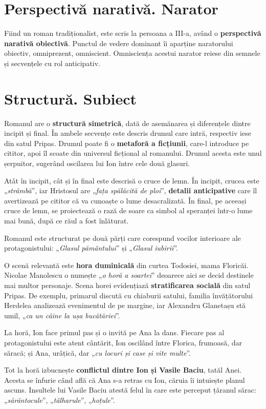 \documentclass{article}
\newcommand{\qu}[1]{„\emph{#1}”}
\begin{document}
\section{Perspectivă narativă. Narator}
Fiind un roman tradiționalist, este scris la persoana a III-a, având o \textbf{perspectivă narativă obiectivă}. Punctul de vedere dominant îi aparține naratorului obiectiv, omniprezent, omniscient. Omnisciența acestui narator reiese din semnele și secvențele cu rol anticipativ.
\section{Structură. Subiect}
Romanul are o \textbf{structură simetrică}, dată de asemănarea și diferențele dintre incipit și final. În ambele secvențe este descris drumul care intră, respectiv iese din satul Pripas. Drumul poate fi o \textbf{metaforă a ficțiunii}, care-l introduce pe cititor, apoi îl scoate din universul ficțional al romanului. Drumul acesta este unul șerpuitor, sugerând oscilarea lui Ion între cele două glasuri.

Atât în incipit, cât și în final este descrisă o cruce de lemn. În incipit, crucea este \qu{strâmbă}, iar Hristosul are \qu{fața spălăcită de ploi}, \textbf{detalii anticipative} care îl avertizează pe cititor că va cunoaște o lume desacralizată. În final, pe aceeași cruce de lemn, se proiectează o rază de soare ca simbol al speranței într-o lume mai bună, după ce răul a fost înlăturat.

Romanul este structurat pe două părți care corespund vocilor interioare ale protagonistului: \qu{Glasul pământului} și \qu{Glasul iubirii}.

O scenă relevantă este \textbf{hora duminicală} din curtea Todosiei, mama Floricăi. Nicolae Manolescu o numește \qu{o horă a soartei} deoarece aici se decid destinele mai multor personaje. Scena horei evidențiază \textbf{stratificarea socială} din satul Pripas. De exemplu, primarul discută cu chiaburii satului, familia învățătorului Herdelea analizează evenimentul de pe margine, iar Alexandru Glanetașu stă umil, \qu{ca un câine la ușa bucătăriei}.

La horă, Ion face primul pas și o invită pe Ana la dans. Fiecare pas al protagonistului este atent cântărit, Ion oscilând între Florica, frumoasă, dar săracă; și Ana, urâțică, dar \qu{cu locuri și case și vite multe}.

Tot la horă izbucnește \textbf{conflictul dintre Ion și Vasile Baciu}, tatăl Anei. Acesta se înfurie când află că Ana s-a retras cu Ion, căruia îi intuiește planul ascuns. Insultele lui Vasile Baciu atestă felul în care este perceput țăranul sărac: \qu{sărăntocule}, \qu{tâlharule}, \qu{hoțule}.
\end{document}

